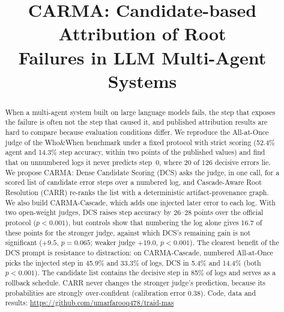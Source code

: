 \documentclass[conference]{IEEEtran}
\begin{document}
\title{CARMA: Candidate-based Attribution of Root\\ Failures in LLM Multi-Agent Systems}

\author{
}

\maketitle

\begin{abstract}
When a multi-agent system built on large language models fails, the step that exposes the failure is often not the step that caused it, and published attribution results are hard to compare because evaluation conditions differ. We reproduce the All-at-Once judge of the Who\&When benchmark under a fixed protocol with strict scoring (52.4\% agent and 14.3\% step accuracy, within two points of the published values) and find that on unnumbered logs it never predicts step~0, where 20 of 126 decisive errors lie. We propose CARMA: Dense Candidate Scoring (DCS) asks the judge, in one call, for a scored list of candidate error steps over a numbered log, and Cascade-Aware Root Resolution (CARR) re-ranks the list with a deterministic artifact-provenance graph. We also build CARMA-Cascade, which adds one injected later error to each log. With two open-weight judges, DCS raises step accuracy by 26--28 points over the official protocol ($p<0.001$), but controls show that numbering the log alone gives 16.7 of these points for the stronger judge, against which DCS's remaining gain is not significant ($+9.5$, $p=0.065$; weaker judge $+19.0$, $p<0.001$). The clearest benefit of the DCS prompt is resistance to distraction: on CARMA-Cascade, numbered All-at-Once picks the injected step in 45.9\% and 33.3\% of logs, DCS in 5.4\% and 14.4\% (both $p<0.001$). The candidate list contains the decisive step in 85\% of logs and serves as a rollback schedule. CARR never changes the stronger judge's prediction, because its probabilities are strongly over-confident (calibration error 0.38). Code, data and results: \url{https://github.com/umarfarooq478/traid-mas}
\end{abstract}
\end{document}
